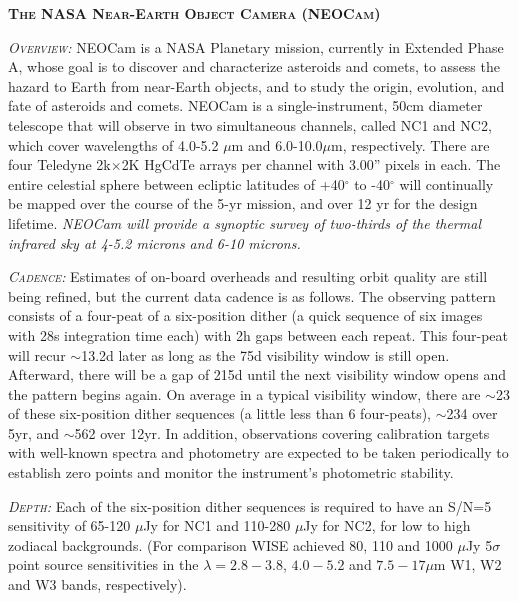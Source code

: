 \documentclass[12pt]{article}
\begin{document}
\smallskip
\smallskip
\noindent
{\bfseries \textsc{\textcolor{Cerulean}{The NASA Near-Earth Object Camera (NEOCam)}}}

\smallskip
\noindent
\textsl{\textsc{Overview:}}
NEOCam is a NASA Planetary mission, currently in Extended Phase A, whose goal
is to discover and characterize asteroids and comets, to assess the
hazard to Earth from near-Earth objects, and to study the origin,
evolution, and fate of asteroids and comets. NEOCam is a
single-instrument, 50cm diameter telescope that will observe in two
simultaneous channels, called NC1 and NC2, which cover wavelengths of
4.0-5.2 $\mu$m and 6.0-10.0$\mu$m, respectively. There are four Teledyne
2k$\times$2K HgCdTe arrays per channel with 3.00'' pixels in each. The entire
celestial sphere between ecliptic latitudes of +40$^{\circ}$ to -40$^{\circ}$ will
continually be mapped over the course of the 5-yr mission, and over 12
yr for the design lifetime. 
{\it NEOCam will provide a synoptic survey of two-thirds of the thermal infrared sky at 4-5.2 microns and 6-10 microns.}

\smallskip
\smallskip
\noindent
\textsl{\textsc{Cadence:}} Estimates of on-board overheads and resulting orbit quality are still being refined, but the current data cadence is as follows. The observing pattern consists of a four-peat of a six-position dither (a quick sequence of six images with 28s integration time each) with 2h gaps between each repeat. This four-peat will recur $\sim$13.2d later as long as the 75d visibility window is still open. Afterward, there will be a gap of 215d until the next visibility window opens and the pattern begins again. On average in a typical visibility window, there are $\sim$23 of these six-position dither sequences (a little less than 6 four-peats), $\sim$234 over 5yr, and $\sim$562 over 12yr.
In addition, observations covering calibration targets with well-known spectra and photometry are expected to be taken periodically to establish zero points and monitor the instrument's photometric stability. %

\smallskip
\smallskip
\noindent
\textsl{\textsc{Depth:}} Each of the six-position dither sequences is required to have an S/N=5 sensitivity of 65-120 $\mu$Jy for NC1 and 110-280 $\mu$Jy for NC2, for low to high zodiacal backgrounds. 
(For comparison WISE achieved 80, 110 and 1000 $\mu$Jy 5$\sigma$ point source sensitivities in the $\lambda=2.8-3.8$, $4.0-5.2$ and $7.5-17\mu$m W1, W2 and W3 bands, respectively).
\end{document}
